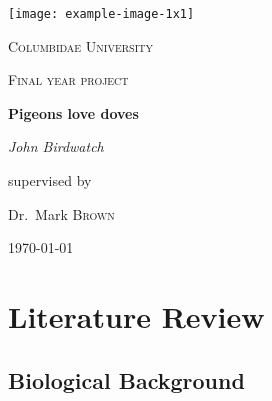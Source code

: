 \documentclass[12pt,a4paper]{article}
\author{D Maderazo}
\begin{document}
\begin{titlepage}
	\centering
	\texttt{[image: example-image-1x1]}\par\vspace{1cm}
	{\scshape\LARGE Columbidae University \par}
	\vspace{1cm}
	{\scshape\Large Final year project\par}
	\vspace{1.5cm}
	{\huge\bfseries Pigeons love doves\par}
	\vspace{2cm}
	{\Large\itshape John Birdwatch\par}
	\vfill
	supervised by\par
	Dr.~Mark \textsc{Brown}

	\vfill

	{\large \today\par}
\end{titlepage}
    

    \section{Literature Review}
        \subsection{Biological Background}
        
\end{document}
